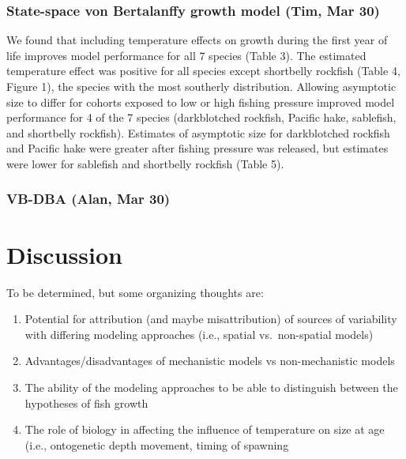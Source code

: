 \documentclass[
]{article}
\begin{document}
\hypertarget{state-space-von-bertalanffy-growth-model-tim-mar-30}{%
\subsubsection{State-space von Bertalanffy growth model (Tim, Mar
30)}\label{state-space-von-bertalanffy-growth-model-tim-mar-30}}

We found that including temperature effects on growth during the first
year of life improves model performance for all 7 species (Table 3). The
estimated temperature effect was positive for all species except
shortbelly rockfish (Table 4, Figure 1), the species with the most
southerly distribution. Allowing asymptotic size to differ for cohorts
exposed to low or high fishing pressure improved model performance for 4
of the 7 species (darkblotched rockfish, Pacific hake, sablefish, and
shortbelly rockfish). Estimates of asymptotic size for darkblotched
rockfish and Pacific hake were greater after fishing pressure was
released, but estimates were lower for sablefish and shortbelly rockfish
(Table 5).

\hypertarget{vb-dba-alan-mar-30}{%
\subsubsection{VB-DBA (Alan, Mar 30)}\label{vb-dba-alan-mar-30}}

\hypertarget{discussion}{%
\section{Discussion}\label{discussion}}

To be determined, but some organizing thoughts are:

\begin{enumerate}
\def\labelenumi{\arabic{enumi})}
\item
  Potential for attribution (and maybe misattribution) of sources of
  variability with differing modeling approaches (i.e., spatial
  vs.~non-spatial models)
\item
  Advantages/disadvantages of mechanistic models vs non-mechanistic
  models
\item
  The ability of the modeling approaches to be able to distinguish
  between the hypotheses of fish growth
\item
  The role of biology in affecting the influence of temperature on size
  at age (i.e., ontogenetic depth movement, timing of spawning
\end{enumerate}
\end{document}
